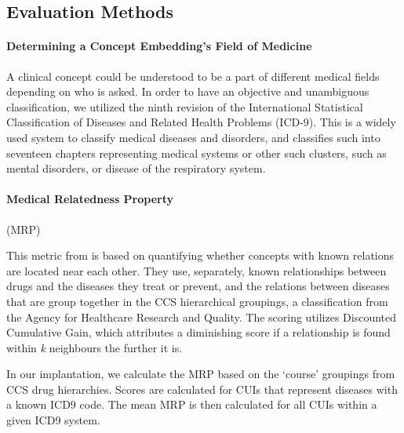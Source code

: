 \documentclass[10pt]{article}
\begin{document}


\subsection{Evaluation Methods}

\paragraph{Determining a Concept Embedding's Field of Medicine}
A clinical concept could be understood to be a part of different medical fields depending on who is asked. In order to have an objective and unambiguous classification, we utilized the ninth revision of the International Statistical Classification of Diseases and Related Health Problems (ICD-9). This is a widely used system to classify medical diseases and disorders, and classifies such into seventeen chapters representing medical systems or other such clusters, such as mental disorders, or disease of the respiratory system.    

\paragraph{Medical Relatedness Property}(MRP)

This metric from \cite{choiLearningLowDimensionalRepresentations2016} is based on quantifying whether concepts with known relations are located near each other. They use, separately, known relationships between drugs and the diseases they treat or prevent, and the relations between diseases that are group together in the CCS hierarchical groupings, a classification from the Agency for Healthcare Research and Quality. The scoring utilizes Discounted Cumulative Gain, which attributes a diminishing score if a relationship is found within \emph{k} neighbours the further it is. 

In our implantation, we calculate the MRP based on the `course' groupings from CCS drug hierarchies. Scores are calculated for CUIs that represent diseases with a known ICD9 code. The mean MRP is then calculated for all CUIs within a given ICD9 system. 
\end{document}
